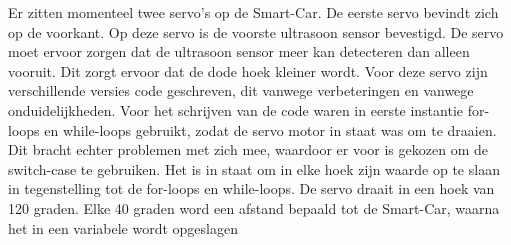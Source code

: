 Er zitten momenteel twee servo's op de \gls{Smart-Car}. De eerste servo bevindt zich op de voorkant. Op deze servo is de voorste ultrasoon sensor bevestigd. De servo moet ervoor zorgen dat de ultrasoon sensor meer kan detecteren dan alleen vooruit. Dit zorgt ervoor dat de dode hoek kleiner wordt. Voor deze servo zijn verschillende versies code geschreven, dit vanwege verbeteringen en vanwege onduidelijkheden. 
Voor het schrijven van de code waren in eerste instantie for-loops en while-loops gebruikt, zodat de servo motor in staat was om te draaien.
Dit bracht echter problemen met zich mee, waardoor er voor is gekozen om de switch-case te gebruiken. Het is in staat om in elke hoek zijn waarde op te slaan in tegenstelling tot de for-loops en while-loops.
De servo draait in een hoek van 120 graden. Elke 40 graden word een afstand bepaald tot de \gls{Smart-Car}, waarna het in een variabele wordt opgeslagen

